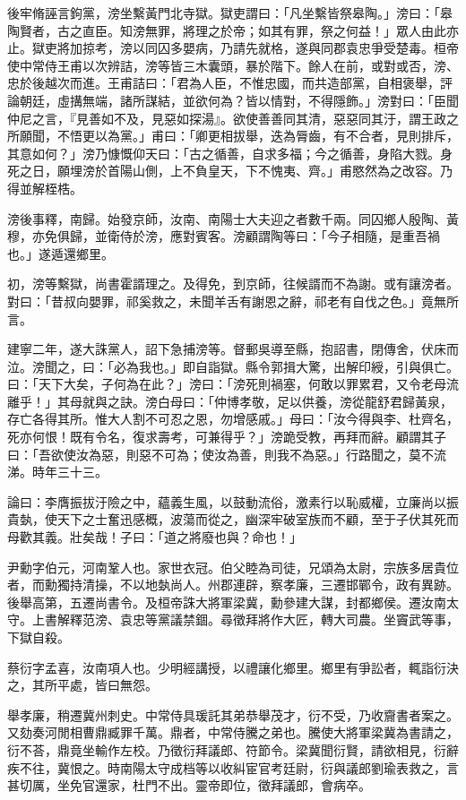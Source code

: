 \begin{pinyinscope}
後牢脩誣言鉤黨，滂坐繫黃門北寺獄。獄吏謂曰：「凡坐繫皆祭皋陶。」滂曰：「皋陶賢者，古之直臣。知滂無罪，將理之於帝；如其有罪，祭之何益！」眾人由此亦止。獄吏將加掠考，滂以同囚多嬰病，乃請先就格，遂與同郡袁忠爭受楚毒。桓帝使中常侍王甫以次辨詰，滂等皆三木囊頭，暴於階下。餘人在前，或對或否，滂、忠於後越次而進。王甫詰曰：「君為人臣，不惟忠國，而共造部黨，自相褒舉，評論朝廷，虛搆無端，諸所謀結，並欲何為？皆以情對，不得隱飾。」滂對曰：「臣聞仲尼之言，『見善如不及，見惡如探湯』。欲使善善同其清，惡惡同其汙，謂王政之所願聞，不悟更以為黨。」甫曰：「卿更相拔舉，迭為脣齒，有不合者，見則排斥，其意如何？」滂乃慷慨仰天曰：「古之循善，自求多福；今之循善，身陷大戮。身死之日，願埋滂於首陽山側，上不負皇天，下不愧夷、齊。」甫愍然為之改容。乃得並解桎梏。

滂後事釋，南歸。始發京師，汝南、南陽士大夫迎之者數千兩。同囚鄉人殷陶、黃穆，亦免俱歸，並衛侍於滂，應對賓客。滂顧謂陶等曰：「今子相隨，是重吾禍也。」遂遁還鄉里。

初，滂等繫獄，尚書霍諝理之。及得免，到京師，往候諝而不為謝。或有讓滂者。對曰：「昔叔向嬰罪，祁奚救之，未聞羊舌有謝恩之辭，祁老有自伐之色。」竟無所言。

建寧二年，遂大誅黨人，詔下急捕滂等。督郵吳導至縣，抱詔書，閉傳舍，伏床而泣。滂聞之，曰：「必為我也。」即自詣獄。縣令郭揖大驚，出解印綬，引與俱亡。曰：「天下大矣，子何為在此？」滂曰：「滂死則禍塞，何敢以罪累君，又令老母流離乎！」其母就與之訣。滂白母曰：「仲博孝敬，足以供養，滂從龍舒君歸黃泉，存亡各得其所。惟大人割不可忍之恩，勿增感戚。」母曰：「汝今得與李、杜齊名，死亦何恨！既有令名，復求壽考，可兼得乎？」滂跪受教，再拜而辭。顧謂其子曰：「吾欲使汝為惡，則惡不可為；使汝為善，則我不為惡。」行路聞之，莫不流涕。時年三十三。

論曰：李膺振拔汙險之中，蘊義生風，以鼓動流俗，激素行以恥威權，立廉尚以振貴埶，使天下之士奮迅感概，波蕩而從之，幽深牢破室族而不顧，至于子伏其死而母歡其義。壯矣哉！子曰：「道之將廢也與？命也！」

尹勳字伯元，河南鞏人也。家世衣冠。伯父睦為司徒，兄頌為太尉，宗族多居貴位者，而勳獨持清操，不以地埶尚人。州郡連辟，察孝廉，三遷邯鄲令，政有異跡。後舉高第，五遷尚書令。及桓帝誅大將軍梁冀，勳參建大謀，封都鄉侯。遷汝南太守。上書解釋范滂、袁忠等黨議禁錮。尋徵拜將作大匠，轉大司農。坐竇武等事，下獄自殺。

蔡衍字孟喜，汝南項人也。少明經講授，以禮讓化鄉里。鄉里有爭訟者，輒詣衍決之，其所平處，皆曰無怨。

舉孝廉，稍遷冀州刺史。中常侍具瑗託其弟恭舉茂才，衍不受，乃收齎書者案之。又劾奏河閒相曹鼎臧罪千萬。鼎者，中常侍騰之弟也。騰使大將軍梁冀為書請之，衍不荅，鼎竟坐輸作左校。乃徵衍拜議郎、符節令。梁冀聞衍賢，請欲相見，衍辭疾不往，冀恨之。時南陽太守成档等以收糾宦官考廷尉，衍與議郎劉瑜表救之，言甚切厲，坐免官還家，杜門不出。靈帝即位，徵拜議郎，會病卒。


\end{pinyinscope}

